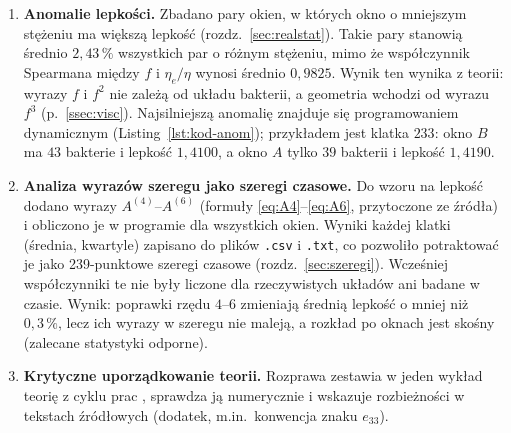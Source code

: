 \documentclass[12pt,a4paper,twoside,openright]{report}
\theoremstyle{definition}
\theoremstyle{remark}
\newcommand{\ziel}[1]{{\color{green!50!black}#1}}
\begin{document}
{\begin{enumerate}[nosep]
\item \textbf{Anomalie lepkości.} Zbadano pary okien, w których okno o mniejszym stężeniu ma większą lepkość (rozdz.~\ref{sec:realstat}). Takie pary stanowią średnio $2{,}43\,\%$ wszystkich par o różnym stężeniu, mimo że współczynnik Spearmana między $f$ i $\eta_e/\eta$ wynosi średnio $0{,}9825$. Wynik ten wynika z teorii: wyrazy $f$ i $f^2$ nie zależą od układu bakterii, a geometria wchodzi od wyrazu $f^3$ (p.~\ref{ssec:visc}). Najsilniejszą anomalię znajduje się programowaniem dynamicznym (Listing~\ref{lst:kod-anom}); przykładem jest klatka $233$: okno $B$ ma $43$ bakterie i lepkość $1{,}4100$, a okno $A$ tylko $39$ bakterii i lepkość $1{,}4190$.
\item \textbf{\ziel{Analiza wyrazów szeregu jako szeregi czasowe.}} \ziel{Do wzoru na lepkość dodano wyrazy $A^{(4)}$--$A^{(6)}$ (formuły \eqref{eq:A4}--\eqref{eq:A6}, przytoczone ze źródła) i obliczono je w programie dla wszystkich okien. Wyniki każdej klatki (średnia, kwartyle) zapisano do plików \texttt{.csv} i \texttt{.txt}, co pozwoliło potraktować je jako 239-punktowe szeregi czasowe (rozdz.~\ref{sec:szeregi}). Wcześniej współczynniki te nie były liczone dla rzeczywistych układów ani badane w czasie. Wynik: poprawki rzędu $4$--$6$ zmieniają średnią lepkość o mniej niż $0{,}3\,\%$, lecz ich wyrazy w szeregu nie maleją, a rozkład po oknach jest skośny (zalecane statystyki odporne).}
\item \textbf{Krytyczne uporządkowanie teorii.} Rozprawa zestawia w jeden wykład teorię z cyklu prac \cite{czapla2025computational,mityushev2025computationalpart3}, sprawdza ją numerycznie i wskazuje rozbieżności w tekstach źródłowych (dodatek, m.in.\ konwencja znaku $e_{33}$).
\end{enumerate}

}
\end{document}
